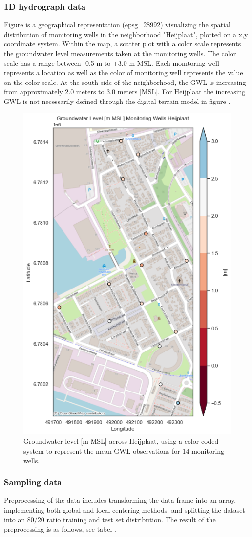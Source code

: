 \subsubsection{1D hydrograph data}
Figure  is a geographical representation (epsg=28992) visualizing the spatial distribution of monitoring wells in the neighborhood "Heijplaat", plotted on a x,y coordinate system. Within the map, a scatter plot with a color scale represents the groundwater level measurements taken at the monitoring wells. The color scale has a range between -0.5 m to +3.0 m MSL. Each monitoring well represents a location as well as the color of monitoring well represents the value on the color scale. At the south side of the neighborhood, the GWL is increasing from approximately 2.0 meters to 3.0 meters [MSL]. For Heijplaat the increasing GWL is not necessarily defined through the digital terrain model in figure .
\begin{figure}[htbp]
    \centering
    \includegraphics[width=0.50\linewidth]{frontmatter/Heijplaat-fig/gwlheij.png}
    \caption{Groundwater level [m MSL] across Heijplaat, using a color-coded system to represent the mean GWL observations for 14 monitoring wells.}
    \label{gwlheij}
\end{figure}


\clearpage

\subsubsection{Sampling data}
Preprocessing of the data includes transforming the data frame into an array, implementing both global and local centering methods, and splitting the dataset into an 80/20 ratio training and test set distribution. The result of the preprocessing is as follows, see tabel .


